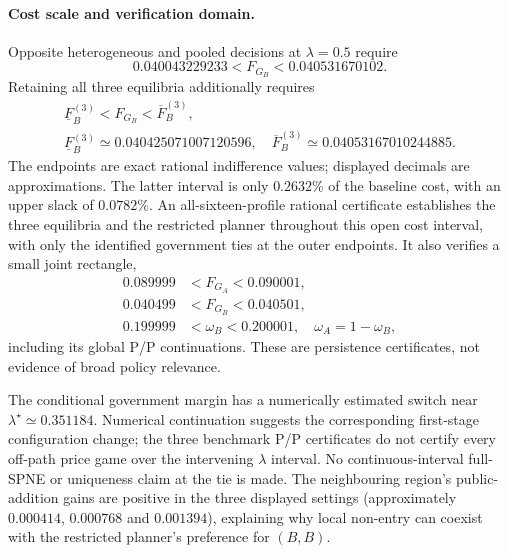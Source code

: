 \paragraph{Cost scale and verification domain.}
Opposite heterogeneous and pooled decisions at $\lambda=0.5$ require
\begin{equation}
 0.040043229233<F_{G_B}<0.040531670102.
 \label{eq:fragility}
\end{equation}
Retaining all three equilibria additionally requires
\begin{equation}
 \begin{split}
 \underline F_B^{(3)}<F_{G_B}<\overline F_B^{(3)},\qquad\\
 \underline F_B^{(3)}\simeq0.040425071007120596,\quad
 \overline F_B^{(3)}\simeq0.04053167010244885.
 \end{split}\label{eq:threeway-open-cost}
\end{equation}
The endpoints are exact rational indifference values; displayed decimals are approximations.
The latter interval is only $0.2632\%$ of the baseline cost, with an upper slack of $0.0782\%$.
An all-sixteen-profile rational certificate establishes the three equilibria and the restricted planner throughout this open cost interval, with only the identified government ties at the outer endpoints.
It also verifies a small joint rectangle,
\begin{equation}
 \begin{split}
 0.089999&<F_{G_A}<0.090001,\\
 0.040499&<F_{G_B}<0.040501,\\
 0.199999&<\omega_B<0.200001,\quad\omega_A=1-\omega_B,
 \end{split}\label{eq:threeway-3d-box}
\end{equation}
including its global P/P continuations.
These are persistence certificates, not evidence of broad policy relevance.

The conditional government margin has a numerically estimated switch near $\lambda^\star\simeq0.351184$.
Numerical continuation suggests the corresponding first-stage configuration change; the three benchmark P/P certificates do not certify every off-path price game over the intervening $\lambda$ interval.
No continuous-interval full-SPNE or uniqueness claim at the tie is made.
The neighbouring region's public-addition gains are positive in the three displayed settings (approximately $0.000414$, $0.000768$ and $0.001394$), explaining why local non-entry can coexist with the restricted planner's preference for $(B,B)$.

